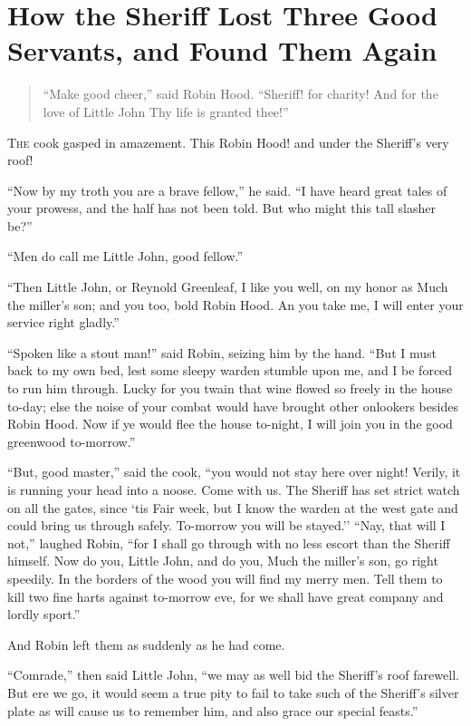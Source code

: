 \chapter{How the Sheriff Lost Three Good Servants, and Found Them Again}

\begin{quote}
“Make good cheer,” said Robin Hood.
“Sheriff! for charity!
And for the love of Little John
Thy life is granted thee!”
\end{quote}

\lettrine{T}{he} cook gasped in amazement. This Robin Hood! and under the Sheriff's
very roof!

``Now by my troth you are a brave fellow,'' he said. ``I have heard
great tales of your prowess, and the half has not been told. But who
might this tall slasher be?''

``Men do call me Little John, good fellow.''

``Then Little John, or Reynold Greenleaf, I like you well, on my honor
as Much the miller's son; and you too, bold Robin Hood. An you take me,
I will enter your service right gladly.''

``Spoken like a stout man!'' said Robin, seizing him by the hand. ``But
I must back to my own bed, lest some sleepy warden stumble upon me, and
I be forced to run him through. Lucky for you twain that wine flowed so
freely in the house to-day; else the noise of your combat would have
brought other onlookers besides Robin Hood. Now if ye would flee the
house to-night, I will join you in the good greenwood to-morrow.''

``But, good master,'' said the cook, ``you would not stay here over
night! Verily, it is running your head into a noose. Come with us. The
Sheriff has set strict watch on all the gates, since `tis Fair week, but
I know the warden at the west gate and could bring us through safely.
To-morrow you will be stayed.'' ``Nay, that will I not,'' laughed Robin,
``for I shall go through with no less escort than the Sheriff himself.
Now do you, Little John, and do you, Much the miller's son, go right
speedily. In the borders of the wood you will find my merry men. Tell
them to kill two fine harts against to-morrow eve, for we shall have
great company and lordly sport.''

And Robin left them as suddenly as he had come.

``Comrade,'' then said Little John, ``we may as well bid the Sheriff's
roof farewell. But ere we go, it would seem a true pity to fail to take
such of the Sheriff's silver plate as will cause us to remember him, and
also grace our special feasts.''

